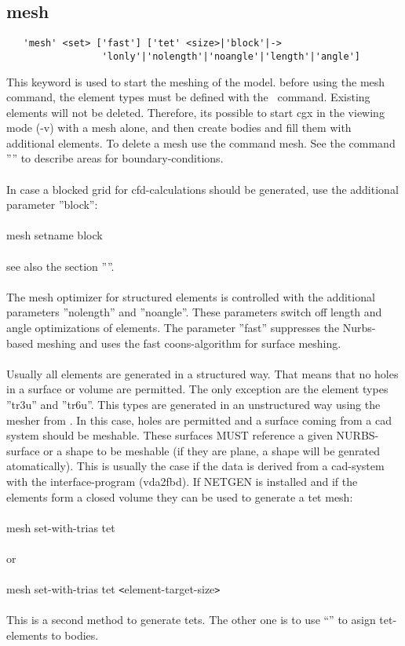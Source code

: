 \documentclass{article}
\begin{document}
 \subsection{\label{mesh}mesh}
\begin{verbatim}
   'mesh' <set> ['fast'] ['tet' <size>|'block'|->
                 'lonly'|'nolength'|'noangle'|'length'|'angle']
\end{verbatim}
This keyword is used to start the meshing of the model. before using the mesh command, the element types must be defined with the \ command.  Existing elements will not be deleted. Therefore, its possible to start cgx in the viewing mode (-v) with a mesh alone, and then create bodies and fill them with additional elements. To delete a mesh use the command  mesh. See the command '''' to describe areas for boundary-conditions. 
\\\\In case a blocked grid for cfd-calculations should be generated, use the additional parameter ''block'':
\\\\mesh setname block\\\\ see also the section ''''.
\\\\The mesh optimizer for structured elements is controlled with the additional parameters ''nolength'' and ''noangle''. These parameters switch off length and angle optimizations of elements. The parameter ''fast'' suppresses the Nurbs-based meshing and uses the fast coons-algorithm for surface meshing.
\\\\Usually all elements are generated in a structured way. That means that no holes in a surface or volume are permitted. The only exception are the element types ''tr3u'' and ''tr6u''. This types are generated in an unstructured way using the mesher from \cite{mesh2d}. In this case, holes are permitted and a surface coming from a cad system should be meshable. These surfaces MUST reference a given NURBS-surface or a shape to be meshable (if they are plane, a shape will be genrated atomatically). This is usually the case if the data is derived from a cad-system with the interface-program (vda2fbd). If NETGEN \cite{NETGEN} is installed and if the elements form a closed volume they can be used to generate a tet mesh:\\\\mesh set-with-trias tet\\\\or\\\\mesh set-with-trias tet \verb_<_element-target-size\verb_>_\\\\This is a second method to generate tets. The other one is to use ``'' to asign tet-elements to bodies.
\end{document}
